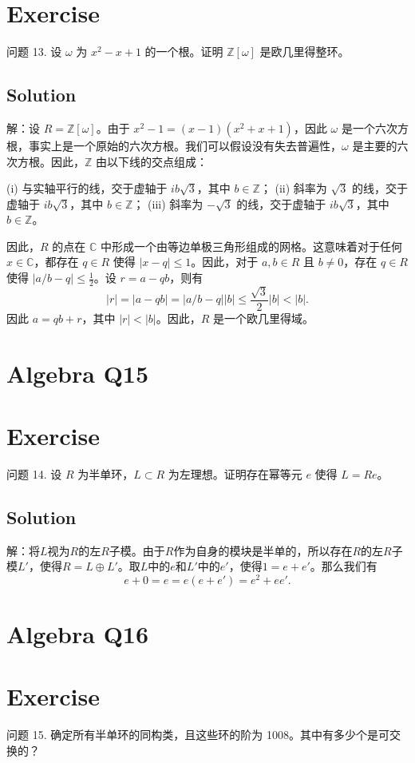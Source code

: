 \documentclass[12pt]{book}
\begin{document}
\section*{Exercise}
问题 13. 设 $\omega$ 为 $x^2 - x + 1$ 的一个根。证明 $\mathbb{Z}[\omega]$ 是欧几里得整环。



\subsection*{Solution}
解：设 $R = \mathbb{Z}[\omega]$。由于 $x^2 - 1 = (x - 1)(x^2 + x + 1)$，因此 $\omega$ 是一个六次方根，事实上是一个原始的六次方根。我们可以假设没有失去普遍性，$\omega$ 是主要的六次方根。因此，$\mathbb{Z}$ 由以下线的交点组成：

(i) 与实轴平行的线，交于虚轴于 $ib\sqrt{3}$，其中 $b \in \mathbb{Z}$；
(ii) 斜率为 $\sqrt{3}$ 的线，交于虚轴于 $ib\sqrt{3}$，其中 $b \in \mathbb{Z}$；
(iii) 斜率为 $-\sqrt{3}$ 的线，交于虚轴于 $ib\sqrt{3}$，其中 $b \in \mathbb{Z}$。

因此，$R$ 的点在 $\mathbb{C}$ 中形成一个由等边单极三角形组成的网格。这意味着对于任何 $x \in \mathbb{C}$，都存在 $q \in R$ 使得 $|x - q| \le 1$。因此，对于 $a, b \in R$ 且 $b \neq 0$，存在 $q \in R$ 使得 $|a/b - q| \le \frac{1}{2}$。设 $r = a - qb$，则有
\[ |r| = |a - qb| = |a/b - q||b| \le \frac{\sqrt{3}}{2}|b| < |b|. \]
因此 $a = qb + r$，其中 $|r| < |b|$。因此，$R$ 是一个欧几里得域。
\newpage
\section{Algebra Q15}
\section*{Exercise}
问题 14. 设 $R$ 为半单环，$L \subset R$ 为左理想。证明存在幂等元 $e$ 使得 $L = Re$。



\subsection*{Solution}
解：将$L$视为$R$的左$R$子模。由于$R$作为自身的模块是半单的，所以存在$R$的左$R$子模$L'$，使得$R = L \oplus L'$。取$L$中的$e$和$L'$中的$e'$，使得$1 = e + e'$。那么我们有
\[e + 0 = e = e(e + e') = e^2 + ee'.\]
\newpage
\section{Algebra Q16}
\section*{Exercise}
问题 15. 确定所有半单环的同构类，且这些环的阶为 1008。其中有多少个是可交换的？
\end{document}
